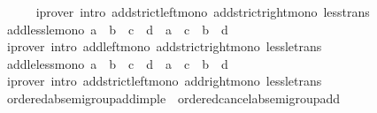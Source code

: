 \begin{isabellebody}
\ \ \ \ \isamarkupfalse%
\ {\isacharparenleft}{\kern0pt}iprover\ intro{\isacharcolon}{\kern0pt}\ add{\isacharunderscore}{\kern0pt}strict{\isacharunderscore}{\kern0pt}left{\isacharunderscore}{\kern0pt}mono\ add{\isacharunderscore}{\kern0pt}strict{\isacharunderscore}{\kern0pt}right{\isacharunderscore}{\kern0pt}mono\ less{\isacharunderscore}{\kern0pt}trans{\isacharparenright}{\kern0pt}\isanewline
{}\isamarkupfalse%
%
\endisatagproof
{\isafoldproof}%
%
\isadelimproof
\isanewline
%
\endisadelimproof
\isanewline
{}\isamarkupfalse%
\ add{\isacharunderscore}{\kern0pt}less{\isacharunderscore}{\kern0pt}le{\isacharunderscore}{\kern0pt}mono{\isacharcolon}{\kern0pt}\ {\isachardoublequoteopen}a\ {\isacharless}{\kern0pt}\ b\ {\isasymLongrightarrow}\ c\ {\isasymle}\ d\ {\isasymLongrightarrow}\ a\ {\isacharplus}{\kern0pt}\ c\ {\isacharless}{\kern0pt}\ b\ {\isacharplus}{\kern0pt}\ d{\isachardoublequoteclose}\isanewline
%
\isadelimproof
\ \ %
\endisadelimproof
%
\isatagproof
{}\isamarkupfalse%
\ {\isacharparenleft}{\kern0pt}iprover\ intro{\isacharcolon}{\kern0pt}\ add{\isacharunderscore}{\kern0pt}left{\isacharunderscore}{\kern0pt}mono\ add{\isacharunderscore}{\kern0pt}strict{\isacharunderscore}{\kern0pt}right{\isacharunderscore}{\kern0pt}mono\ less{\isacharunderscore}{\kern0pt}le{\isacharunderscore}{\kern0pt}trans{\isacharparenright}{\kern0pt}%
\endisatagproof
{\isafoldproof}%
%
\isadelimproof
\isanewline
%
\endisadelimproof
\isanewline
{}\isamarkupfalse%
\ add{\isacharunderscore}{\kern0pt}le{\isacharunderscore}{\kern0pt}less{\isacharunderscore}{\kern0pt}mono{\isacharcolon}{\kern0pt}\ {\isachardoublequoteopen}a\ {\isasymle}\ b\ {\isasymLongrightarrow}\ c\ {\isacharless}{\kern0pt}\ d\ {\isasymLongrightarrow}\ a\ {\isacharplus}{\kern0pt}\ c\ {\isacharless}{\kern0pt}\ b\ {\isacharplus}{\kern0pt}\ d{\isachardoublequoteclose}\isanewline
%
\isadelimproof
\ \ %
\endisadelimproof
%
\isatagproof
{}\isamarkupfalse%
\ {\isacharparenleft}{\kern0pt}iprover\ intro{\isacharcolon}{\kern0pt}\ add{\isacharunderscore}{\kern0pt}strict{\isacharunderscore}{\kern0pt}left{\isacharunderscore}{\kern0pt}mono\ add{\isacharunderscore}{\kern0pt}right{\isacharunderscore}{\kern0pt}mono\ less{\isacharunderscore}{\kern0pt}le{\isacharunderscore}{\kern0pt}trans{\isacharparenright}{\kern0pt}%
\endisatagproof
{\isafoldproof}%
%
\isadelimproof
\isanewline
%
\endisadelimproof
\isanewline
{}\isamarkupfalse%
\isanewline
\isanewline
{}\isamarkupfalse%
\ ordered{\isacharunderscore}{\kern0pt}ab{\isacharunderscore}{\kern0pt}semigroup{\isacharunderscore}{\kern0pt}add{\isacharunderscore}{\kern0pt}imp{\isacharunderscore}{\kern0pt}le\ {\isacharequal}{\kern0pt}\ ordered{\isacharunderscore}{\kern0pt}cancel{\isacharunderscore}{\kern0pt}ab{\isacharunderscore}{\kern0pt}semigroup{\isacharunderscore}{\kern0pt}add\ {\isacharplus}{\kern0pt}\isanewline

\end{isabellebody}
